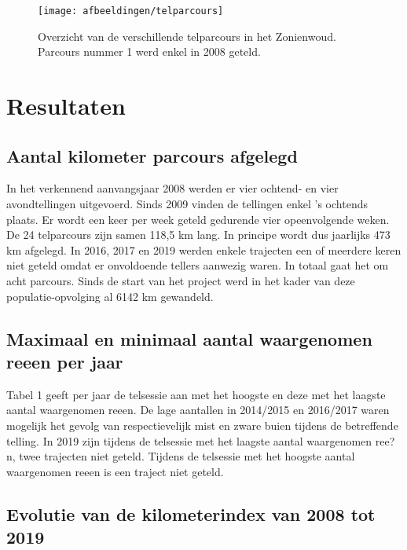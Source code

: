 \documentclass[twoside]{extreport}
\begin{document}
\begin{figure}

{\centering \texttt{[image: afbeeldingen/telparcours]} 

}

\caption{Overzicht van de verschillende telparcours in het Zonienwoud. Parcours nummer 1 werd enkel in 2008 geteld.}\label{fig:telparcours}
\end{figure}

\chapter{Resultaten}\label{resultaten}

\section{Aantal kilometer parcours
afgelegd}\label{aantal-kilometer-parcours-afgelegd}

In het verkennend aanvangsjaar 2008 werden er vier ochtend- en vier
avondtellingen uitgevoerd. Sinds 2009 vinden de tellingen enkel 's
ochtends plaats. Er wordt een keer per week geteld gedurende vier
opeenvolgende weken. De 24 telparcours zijn samen 118,5 km lang. In
principe wordt dus jaarlijks 473 km afgelegd. In 2016, 2017 en 2019
werden enkele trajecten een of meerdere keren niet geteld omdat er
onvoldoende tellers aanwezig waren. In totaal gaat het om acht parcours.
Sinds de start van het project werd in het kader van deze
populatie-opvolging al 6142 km gewandeld.

\section{Maximaal en minimaal aantal waargenomen reeen per
jaar}\label{maximaal-en-minimaal-aantal-waargenomen-reeen-per-jaar}

Tabel 1 geeft per jaar de telsessie aan met het hoogste en deze met het
laagste aantal waargenomen reeen. De lage aantallen in 2014/2015 en
2016/2017 waren mogelijk het gevolg van respectievelijk mist en zware
buien tijdens de betreffende telling. In 2019 zijn tijdens de telsessie
met het laagste aantal waargenomen ree?n, twee trajecten niet geteld.
Tijdens de telsessie met het hoogste aantal waargenomen reeen is een
traject niet geteld.

\section{Evolutie van de kilometerindex van 2008 tot
2019}\label{evolutie-van-de-kilometerindex-van-2008-tot-2019}
\end{document}
